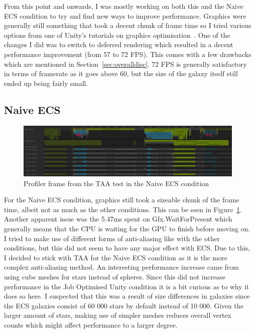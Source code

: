 From this point and onwards, I was mostly working on both this and the Naive ECS condition to try and find new ways to improve performance. Graphics were generally still something that took a decent chunk of frame time so I tried various options from one of Unity's tutorials on graphics optimisation~\cite{unityPerformanceTutorial}. One of the changes I did was to switch to deferred rendering which resulted in a decent performance improvement (from 57 to 72 FPS). This comes with a few drawbacks which are mentioned in Section~\ref{sec:overalldisc}. 72 FPS is generally satisfactory in terms of framerate as it goes above 60, but the size of the galaxy itself still ended up being fairly small. 

\subsection{Naive ECS}
\begin{figure}[tbph]
    \centering
    \includegraphics[width=1\textwidth]{Figures/NaiveECSStandardFrame.png}
    \caption[Profiler frame from a Naive ECS test]{Profiler frame from the TAA test in the Naive ECS condition}
    \label{fig:ecstaaframe}
\end{figure}

For the Naive ECS condition, graphics still took a sizeable chunk of the frame time, albeit not as much as the other conditions. This can be seen in Figure~\ref{fig:ecstaaframe}. Another apparent issue was the 5.47ms spent on Gfx.WaitForPresent which generally means that the CPU is waiting for the GPU to finish before moving on. I tried to make use of different forms of anti-aliasing like with the other conditions, but this did not seem to have any major effect with ECS. Due to this, I decided to stick with TAA for the Naive ECS condition as it is the more complex anti-aliasing method. An interesting performance increase came from using cube meshes for stars instead of spheres. Since this did not increase performance in the Job Optimised Unity condition it is a bit curious as to why it does so here. I suspected that this was a result of size differences in galaxies since the ECS galaxies consist of 60 000 stars by default instead of 10 000. Given the larger amount of stars, making use of simpler meshes reduces overall vertex counts which might affect performance to a larger degree.  

